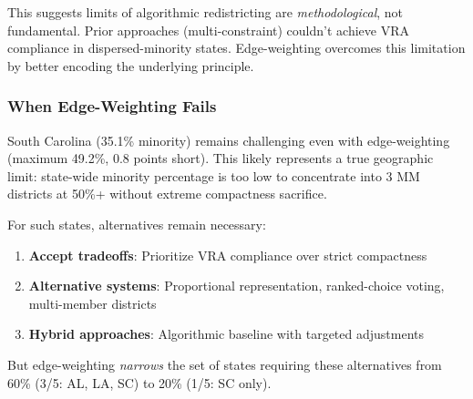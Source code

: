 This suggests limits of algorithmic redistricting are \textit{methodological}, not fundamental. Prior approaches (multi-constraint) couldn't achieve VRA compliance in dispersed-minority states. Edge-weighting overcomes this limitation by better encoding the underlying principle.

\subsubsection{When Edge-Weighting Fails}

South Carolina (35.1\% minority) remains challenging even with edge-weighting (maximum 49.2\%, 0.8 points short). This likely represents a true geographic limit: state-wide minority percentage is too low to concentrate into 3 MM districts at 50\%+ without extreme compactness sacrifice.

For such states, alternatives remain necessary:
\begin{enumerate}
\item \textbf{Accept tradeoffs}: Prioritize VRA compliance over strict compactness
\item \textbf{Alternative systems}: Proportional representation, ranked-choice voting, multi-member districts
\item \textbf{Hybrid approaches}: Algorithmic baseline with targeted adjustments
\end{enumerate}

But edge-weighting \textit{narrows} the set of states requiring these alternatives from 60\% (3/5: AL, LA, SC) to 20\% (1/5: SC only).

